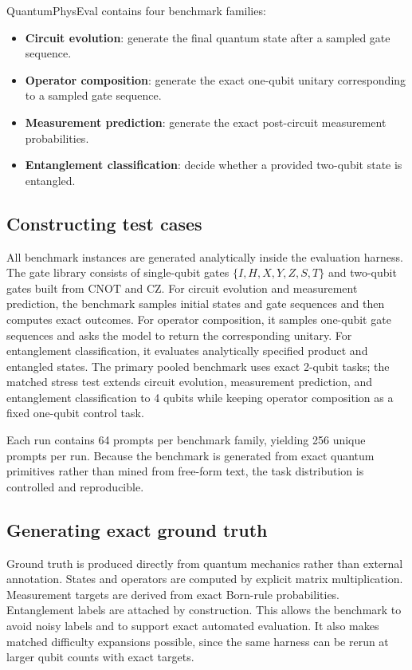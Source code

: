 \documentclass[11pt]{article}
\begin{document}
QuantumPhysEval contains four benchmark families:
\begin{itemize}
\item \textbf{Circuit evolution}: generate the final quantum state after a sampled gate sequence.
\item \textbf{Operator composition}: generate the exact one-qubit unitary corresponding to a sampled gate sequence.
\item \textbf{Measurement prediction}: generate the exact post-circuit measurement probabilities.
\item \textbf{Entanglement classification}: decide whether a provided two-qubit state is entangled.
\end{itemize}

\subsection{Constructing test cases}
All benchmark instances are generated analytically inside the evaluation harness. The gate library consists of single-qubit gates $\{I,H,X,Y,Z,S,T\}$ and two-qubit gates built from $\mathrm{CNOT}$ and $\mathrm{CZ}$. For circuit evolution and measurement prediction, the benchmark samples initial states and gate sequences and then computes exact outcomes. For operator composition, it samples one-qubit gate sequences and asks the model to return the corresponding unitary. For entanglement classification, it evaluates analytically specified product and entangled states. The primary pooled benchmark uses exact 2-qubit tasks; the matched stress test extends circuit evolution, measurement prediction, and entanglement classification to 4 qubits while keeping operator composition as a fixed one-qubit control task.

Each run contains 64 prompts per benchmark family, yielding 256 unique prompts per run. Because the benchmark is generated from exact quantum primitives rather than mined from free-form text, the task distribution is controlled and reproducible.

\subsection{Generating exact ground truth}
Ground truth is produced directly from quantum mechanics rather than external annotation. States and operators are computed by explicit matrix multiplication. Measurement targets are derived from exact Born-rule probabilities. Entanglement labels are attached by construction. This allows the benchmark to avoid noisy labels and to support exact automated evaluation. It also makes matched difficulty expansions possible, since the same harness can be rerun at larger qubit counts with exact targets.
\end{document}
